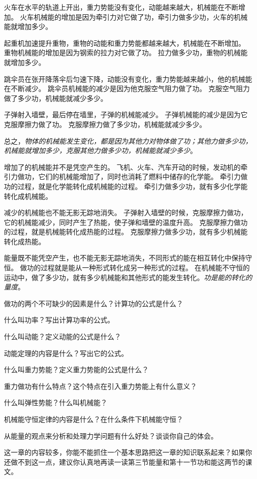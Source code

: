火车在水平的轨道上开出，重力势能没有变化，动能越来越大，机械能在不断增加。
火车机械能的增加是因为牵引力对它做了功，牵引力做多少功，火车的机械能就增加多少。

起重机加速提升重物，重物的动能和重力势能都越来越大，机械能在不断增加。
重物机械能的增加是因为钢索的拉力对它做了功。
拉力做多少功，重物的机械能就增加多少。

跳伞员在张开降落伞后匀速下降，动能没有变化，重力势能越来越小，他的机械能在不断减少。
跳伞员机械能的减少是因为他克服空气阻力做了功。
克服空气阻力做了多少功，机械能就减少多少。

子弹射入墙壁，最后停在墙里，子弹的机械能减少。
子弹机械能的减少是因为它克服摩擦力做了功。
克服摩擦力做了多少功，机械能就减少多少。

总之，\emph{物体的机械能发生变化，都是因为其他力对物体做了功；其他力做多少功，机械能就增加多少，克服其他力做多少功，机械能就减少多少}。

增加了的机械能并不是凭空产生的。
飞机、火车、汽车开动的时候，发动机的牵引力做功，它们的机械能增加了，同时也消耗了燃料中储存的化学能。
牵引力做功的过程，就是化学能转化成机械能的过程。
牵引力做多少功，就有多少化学能转化成机械能。

减少的机械能也不能无影无踪地消失。
子弹射入墙壁的时候，克服摩擦力做功，它的机械能减少，同时产生了热能，使子弹和墙壁的温度升高。
克服摩擦力做功的过程，就是机械能转化成热能的过程。
克服摩擦力做多少功，就有多少机械能转化成热能。

能量既不能凭空产生，也不能无影无踪地消失，不同形式的能在相互转化中保持守恒。
做功的过程就是能从一种形式转化成另一种形式的过程。
在机械能不守恒的运动中，做了多少功，就有多少机械能和其他形式的能发生转化。\emph{功是能的转化的量度}。

\begin{Review}
\begin{question}
  \item 做功的两个不可缺少的因素是什么？计算功的公式是什么？
  \item 什么叫功率？写出计算功率的公式。
  \item 什么叫动能？定义动能的公式是什么？
  \item 动能定理的内容是什么？写出它的公式。
  \item 什么叫重力势能？定义重力势能的公式是什么？
  \item 重力做功有什么特点？这个特点在引入重力势能上有什么意义？
  \item 什么叫弹性势能？什么叫机械能？
  \item 机械能守恒定律的内容是什么？在什么条件下机械能守恒？
  \item 从能量的观点来分析和处理力学问题有什么好处？谈谈你自己的体会。
  \item 这一章的内容较多，你能不能抓住一个基本思路把这一章的知识联系起来？如果你还做不到这一点，建议你认真地再读一读第三节能量和第十一节功和能这两节的课文。
\end{question}
\end{Review}

